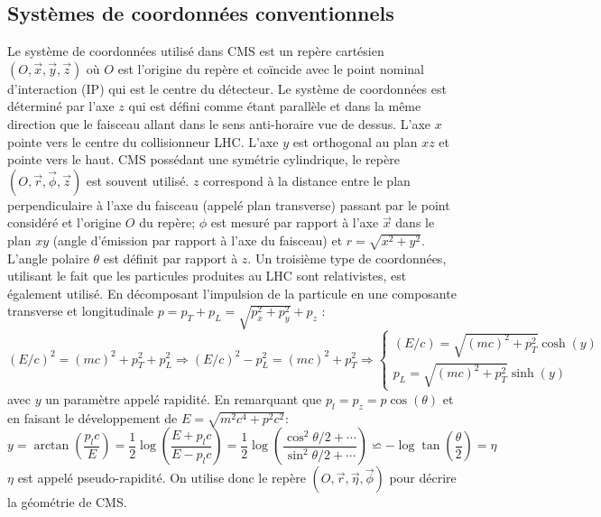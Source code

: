 \subsection{Systèmes de coordonnées conventionnels}
Le système de coordonnées utilisé dans CMS est un repère cartésien $\left(O,\vec{x},\vec{y},\vec{z}\right)$ où $O$ est l'origine du repère et coïncide avec le point nominal d'interaction (IP) qui est le centre du détecteur. Le système de coordonnées est déterminé par l'axe $z$ qui est défini comme étant parallèle et dans la même direction que le faisceau allant dans le sens anti-horaire vue de dessus. L'axe $x$ pointe vers le centre du collisionneur LHC. L'axe $y$ est orthogonal au plan $xz$ et pointe vers le haut. CMS possédant une symétrie cylindrique, le repère $\left(O,\vec{r},\vec{\phi},\vec{z}\right)$ est souvent utilisé. $z$ correspond à la distance entre le plan perpendiculaire à l'axe du faisceau (appelé plan transverse) passant par le point considéré et l'origine $O$ du repère; $\phi$ est mesuré par rapport à l'axe $\vec{x}$ dans le plan $xy$ (angle d'émission par rapport à l'axe du faisceau) et $r=\sqrt{x^2+y^2}$. L'angle polaire $\theta$ est définit par rapport à $z$. Un troisième type de coordonnées, utilisant le fait que les particules produites au LHC sont relativistes, est également utilisé. En décomposant l'impulsion de la particule en une composante transverse et longitudinale $p=p_{T}+p_{L}=\sqrt{p_{x}^{2}+p_{y}^{2}}+p_{z}$ :
\begin{equation}
(E/c)^{2}=(mc)^{2}+p_{T}^{2}+p_{L}^{2}\Longrightarrow (E/c)^{2}-p_{L}^{2}=(mc)^{2}+p_{T}^{2}\Longrightarrow  \begin{cases}
\left(E/c \right)=\sqrt{\left(mc \right)^{2}+p_{T}^{2}}\cosh(y) \\
p_{L}=\sqrt{\left(mc \right)^{2}+p_{T}^{2}}\sinh(y)
\end{cases}
\end{equation}
avec $y$ un paramètre appelé rapidité. En remarquant que $p_{l}=p_{z}=p\cos(\theta)$ et en faisant le développement de $E=\sqrt{m^{2}c^{4}+p^{2}c^{2}}$:
\begin{equation}
y=\arctan\left(\frac{p_{l}c}{E}\right)=\frac{1}{2}\log\left(\frac{E+p_{l}c}{E-p_{l}c}\right)=\frac{1}{2}\log\left(\frac{\cos^2 \theta/2+\cdots}{\sin^2 \theta/2+\cdots}\right)\backsimeq-\log\tan\left(\frac{\theta}{2}\right)=\eta
\end{equation}
$\eta$ est appelé pseudo-rapidité. On utilise donc le repère $\left(O,\vec{r},\vec{\eta},\vec{\phi}\right)$ pour décrire la géométrie de CMS.

